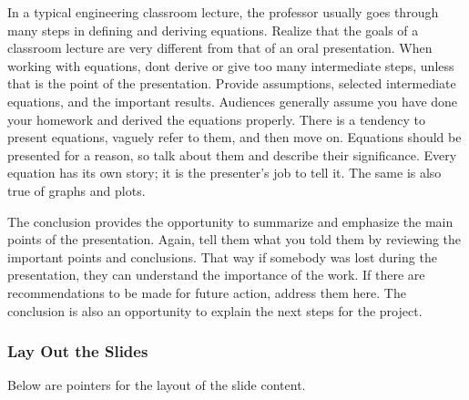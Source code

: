 In a typical engineering classroom lecture, the professor usually goes
through many steps in defining and deriving equations. Realize that the
goals of a classroom lecture are very different from that of an oral
presentation. When working with equations, don\textquotesingle t derive
or give too many intermediate steps, unless that is the point of the
presentation. Provide assumptions, selected intermediate equations, and
the important results. Audiences generally assume you have done your
homework and derived the equations properly. There is a tendency to
present equations, vaguely refer to them, and then move on. Equations
should be presented for a reason, so talk about them and describe their
significance. Every equation has its own story; it is the presenter's
job to tell it. The same is also true of graphs and plots.

The conclusion provides the opportunity to summarize and emphasize the
main points of the presentation. Again, tell them what you told them by
reviewing the important points and conclusions. That way if somebody was
lost during the presentation, they can understand the importance of the
work. If there are recommendations to be made for future action, address
them here. The conclusion is also an opportunity to explain the next
steps for the project.

\subsubsection*{Lay Out the Slides}\label{lay-out-the-slides}

Below are pointers for the layout of the slide content.

